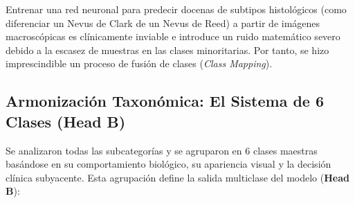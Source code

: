 Entrenar una red neuronal para predecir docenas de subtipos histológicos (como diferenciar un Nevus de Clark de un Nevus de Reed) a partir de imágenes macroscópicas es clínicamente inviable e introduce un ruido matemático severo debido a la escasez de muestras en las clases minoritarias. Por tanto, se hizo imprescindible un proceso de fusión de clases (\textit{Class Mapping}).

\subsection{Armonización Taxonómica: El Sistema de 6 Clases (Head B)}
Se analizaron todas las subcategorías y se agruparon en 6 clases maestras basándose en su comportamiento biológico, su apariencia visual y la decisión clínica subyacente. Esta agrupación define la salida multiclase del modelo (\textbf{Head B}):


